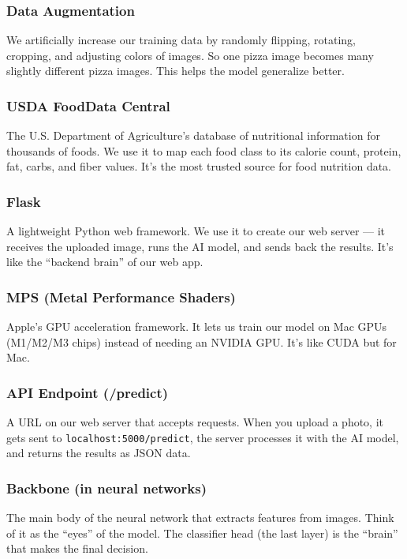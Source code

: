 \documentclass[11pt,a4paper]{article}
\begin{document}
\subsubsection{Data Augmentation}
We artificially increase our training data by randomly flipping, rotating, cropping, and adjusting colors of images. So one pizza image becomes many slightly different pizza images. This helps the model generalize better.

\subsubsection{USDA FoodData Central}
The U.S. Department of Agriculture's database of nutritional information for thousands of foods. We use it to map each food class to its calorie count, protein, fat, carbs, and fiber values. It's the most trusted source for food nutrition data.

\subsubsection{Flask}
A lightweight Python web framework. We use it to create our web server --- it receives the uploaded image, runs the AI model, and sends back the results. It's like the ``backend brain'' of our web app.

\subsubsection{MPS (Metal Performance Shaders)}
Apple's GPU acceleration framework. It lets us train our model on Mac GPUs (M1/M2/M3 chips) instead of needing an NVIDIA GPU. It's like CUDA but for Mac.

\subsubsection{API Endpoint (/predict)}
A URL on our web server that accepts requests. When you upload a photo, it gets sent to \texttt{localhost:5000/predict}, the server processes it with the AI model, and returns the results as JSON data.

\subsubsection{Backbone (in neural networks)}
The main body of the neural network that extracts features from images. Think of it as the ``eyes'' of the model. The classifier head (the last layer) is the ``brain'' that makes the final decision.
\end{document}

